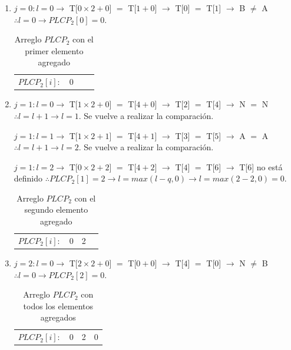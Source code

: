 \begin{enumerate}

\item $j=0: l=0 \rightarrow$ T[$0 \times 2+0$] $=$ T[$1+0$] $\rightarrow$ T[$0$] $=$ T[$1$] $\rightarrow$ B $\neq$ A $\therefore l=0 \rightarrow PLCP_{2}[0] = 0$.

\begin{table}[!htb]
\centering
\begin{tabular}{c|c|c|c|}
\cline{2-4}
$PLCP_{2}[i]:$ & 0 &  & \\ \cline{2-4}
\end{tabular}
\caption{Arreglo $PLCP_{2}$ con el primer elemento agregado}
\end{table}

\item $j=1: l=0 \rightarrow$ T[$1 \times 2+0$] $=$ T[$4+0$] $\rightarrow$ T[$2$] $=$ T[$4$] $\rightarrow$ N $=$ N $\therefore l=l+1 \rightarrow l=1$. Se vuelve a realizar la comparación.

$j=1: l=1 \rightarrow$ T[$1 \times 2+1$] $=$ T[$4+1$] $\rightarrow$ T[$3$] $=$ T[$5$] $\rightarrow$ A $=$ A $\therefore l=l+1 \rightarrow l=2$. Se vuelve a realizar la comparación.

$j=1: l=2 \rightarrow$ T[$0 \times 2+2$] $=$ T[$4+2$] $\rightarrow$ T[$4$] $=$ T[$6$] $\rightarrow$ T[$6$] no está definido $\therefore PLCP_{2}[1] = 2 \rightarrow l=max(l-q,0) \rightarrow l=max(2-2,0) = 0$.

\begin{table}[!htb]
\centering
\begin{tabular}{c|c|c|c|}
\cline{2-4}
$PLCP_{2}[i]:$ & 0 & 2 & \\ \cline{2-4}
\end{tabular}
\caption{Arreglo $PLCP_{2}$ con el segundo elemento agregado}
\end{table}

\item $j=2: l=0 \rightarrow$ T[$2 \times 2+0$] $=$ T[$0+0$] $\rightarrow$ T[$4$] $=$ T[$0$] $\rightarrow$ N $\neq$ B $\therefore l=0 \rightarrow PLCP_{2}[2] = 0$.

\begin{table}[!htb]
\centering
\begin{tabular}{c|c|c|c|}
\cline{2-4}
$PLCP_{2}[i]:$ & 0 & 2 & 0\\ \cline{2-4}
\end{tabular}
\caption{Arreglo $PLCP_{2}$ con todos los elementos agregados}
\end{table}

\end{enumerate}

